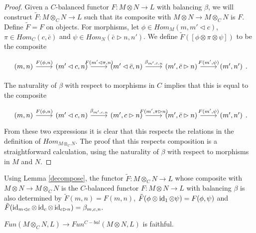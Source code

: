 \begin{proof}
  Given a $C$-balanced functor $F:M\otimes N \to L$ with balancing $\beta$, we
  will construct $\tilde{F}:M\otimes_C N \to L$ such that its composite with
  $M\otimes N\to M\otimes_C N$ is $F$. Define $\tilde{F} = F$ on objects.
  For morphisms, let $\phi\in Hom_M(m,m'\lhd c)$, $\pi\in Hom_C(c,\bar{c})$
  and $\psi\in Hom_N(\bar{c}\rhd n,n')$. We define
  $\tilde{F}([\phi\otimes\pi\otimes\psi])$ to be the composite

  \[
    \begin{tikzcd}
      {(m,n)} & {(m'\lhd c,n)} & {(m'\lhd \bar{c},n)} & {(m',\bar{c}\rhd n)} & {(m',n')}
      \arrow["{F(\phi,n)}", from=1-1, to=1-2]
      \arrow["{F(m'\lhd\pi,n)}", from=1-2, to=1-3]
      \arrow["{\beta_{m',\bar{c},n}}", from=1-3, to=1-4]
      \arrow["{F(m',\psi)}", from=1-4, to=1-5]
    \end{tikzcd}.
  \]

  \noindent The naturality of $\beta$ with respect to morphisms in $C$ implies
  that this is equal to the composite

  \[
    \begin{tikzcd}
      {(m,n)} & {(m'\lhd c,n)} & {(m', c\rhd n)} & {(m',\bar{c}\rhd n)} & {(m',n')}
      \arrow["{F(\phi,n)}", from=1-1, to=1-2]
      \arrow["{\beta_{m',c,n}}", from=1-2, to=1-3]
      \arrow["{F(m',\pi\rhd n)}", from=1-3, to=1-4]
      \arrow["{F(m',\psi)}", from=1-4, to=1-5]
    \end{tikzcd}.
  \]
  From these two expressions it is clear that this respects the relations in
  the definition of $Hom_{M\otimes_C N}$. The proof that this respects
  composition is a straightforward calculation, using the naturality of
  $\beta$ with respect to morphisms in $M$ and $N$.
  \end{proof}

  \begin{remark}
    Using Lemma \ref{decompose}, the functor $\tilde{F}:M\otimes_C N\to L$
    whose composite with $M\otimes N\to M\otimes_C N$ is the $C$-balanced
    functor $F:M\otimes N\to L$ with balancing $\beta$ is also determined by
    $\tilde{F}(m,n)=F(m,n)$,
    $\tilde{F}(\phi\otimes\operatorname{id}_1\otimes\psi)=F(\phi,\psi)$ and
    $\tilde{F}(\operatorname{id}_{m\lhd c}\otimes\operatorname{id}_c\otimes\operatorname{id}_{c\rhd n})=\beta_{m,c,n}.$
  \end{remark}

\begin{lemma}\label{faithful}
  $Fun(M\otimes_C N,L)\to Fun^{C-bal}(M\otimes N,L)$ is faithful.
\end{lemma}

